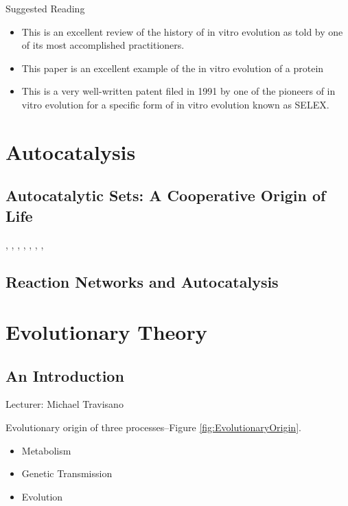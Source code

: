\documentclass[]{article}
\begin{document}
Suggested Reading
\begin{itemize}
	\item \cite{joyce2007forty}This is an excellent review of the history of in vitro evolution as told by one of its most accomplished practitioners.
	\item \cite{seelig2007selection} This paper is an excellent example of the in vitro evolution of a protein
	\item \cite{chen2007ribozyme} This is a very well-written patent filed in 1991 by one of the pioneers of in
	vitro evolution for a specific form of in vitro evolution known as SELEX.
\end{itemize}


\section{Autocatalysis}

\subsection{Autocatalytic Sets: A Cooperative Origin of Life}
\cite{wim2017origin}, \cite{hordijk2017chasing}, \cite{wim2019wandering}, \cite{patzke2007self}, \cite{vaidya2012spontaneous}, \cite{ashkenasy2004design}, \cite{hordijk2012structure}, \cite{sousa2015autocatalytic}

\subsection{Reaction Networks and Autocatalysis}

\section{Evolutionary Theory}

\subsection{An Introduction}

Lecturer: Michael Travisano

Evolutionary origin of three processes--Figure \ref{fig:EvolutionaryOrigin}.

\begin{itemize}
	\item Metabolism
	\item Genetic Transmission
	\item Evolution
\end{itemize}
\end{document}
